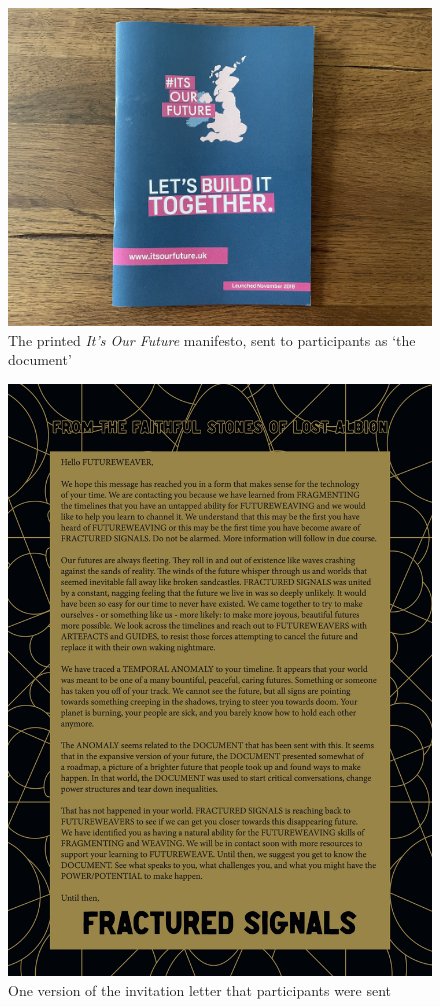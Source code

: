 \begin{figure}[!hbt]
    \centering
       \includegraphics[width=1\linewidth]{Images/8/fs-doc.jpeg}
    \caption{The printed \emph{It's Our Future} manifesto, sent to participants as `the document'}
    \label{fig:fs-document}
\end{figure}
\begin{figure}[!hbt]
    \centering
    \includegraphics[width=1\linewidth]{Images/8/fs-letter.jpg}
    \caption{One version of the invitation letter that participants were sent}
    \label{fig:fs-invitation}
\end{figure}

